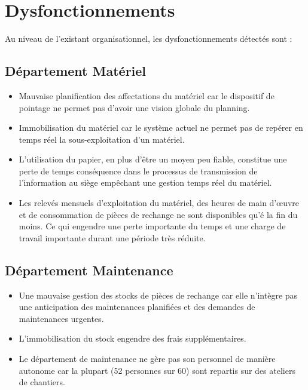 		
		
\section{Dysfonctionnements}	
		
		Au niveau de l'existant organisationnel, les dysfonctionnements détectés sont :
		
		\subsection{Département Matériel}
				\begin{itemize}
						\item Mauvaise planification des affectations du matériel car le dispositif de pointage ne permet pas d'avoir une vision globale du planning.
						\item Immobilisation du matériel car le système actuel ne permet pas de repérer en temps réel la sous-exploitation d'un matériel.
						\item L'utilisation du papier, en plus d'être un moyen peu fiable, constitue une perte de temps conséquence dans le processus de transmission de l'information au siège empêchant une gestion temps réel du matériel.
						\item Les relevés mensuels d'exploitation du matériel, des heures de main d'œuvre et de consommation de pièces de rechange ne sont disponibles qu'é la fin du moins. Ce qui engendre une perte importante du temps et une charge de travail importante durant une période très réduite.
				\end{itemize}
		
		\subsection{Département Maintenance}
				\begin{itemize}
						\item Une mauvaise gestion des stocks de pièces de rechange car elle n'intègre pas une anticipation des maintenances planifiées et des demandes de maintenances urgentes.
						\item L'immobilisation du stock engendre des frais supplémentaires.
						\item Le département de maintenance ne gère pas son personnel de manière autonome car la plupart (52 personnes sur 60) sont repartis sur des ateliers de chantiers.
				\end{itemize}
		
